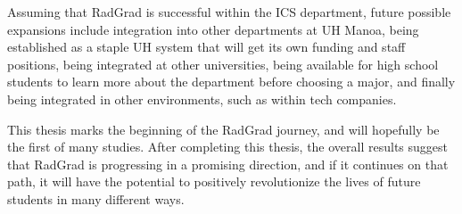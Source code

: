 Assuming that RadGrad is successful within the ICS department, future possible expansions include integration into other departments at UH Manoa, being established as a staple UH system that will get its own funding and staff positions, being integrated at other universities, being available for high school students to learn more about the department before choosing a major, and finally being integrated in other environments, such as within tech companies. 

This thesis marks the beginning of the RadGrad journey, and will hopefully be the first of many studies. After completing this thesis, the overall results suggest that RadGrad is progressing in a promising direction, and if it continues on that path, it will have the potential to positively revolutionize the lives of future students in many different ways.   